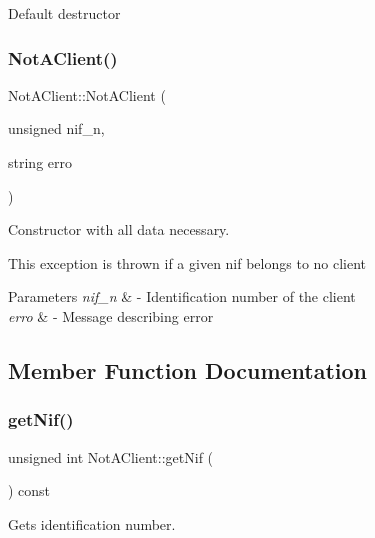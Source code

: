 Default destructor \mbox{\label{class_not_a_client_ababe63b9416f4dd90045d6086292724d}} 
\subsubsection{\texorpdfstring{Not\+A\+Client()}{NotAClient()}}
{\footnotesize\ttfamily Not\+A\+Client\+::\+Not\+A\+Client (\begin{DoxyParamCaption}\item[{unsigned}]{nif\+\_\+n,  }\item[{string}]{erro }\end{DoxyParamCaption})\hspace{0.3cm}{\ttfamily [inline]}}



Constructor with all data necessary. 

This exception is thrown if a given nif belongs to no client


\begin{DoxyParams}{Parameters}
{\em nif\+\_\+n} & -\/ Identification number of the client \\
\hline
{\em erro} & -\/ Message describing error \\
\hline
\end{DoxyParams}


\subsection{Member Function Documentation}
\mbox{\label{class_not_a_client_a70136e2a67ce191dd0091bb8ace19dd9}} 
\subsubsection{\texorpdfstring{get\+Nif()}{getNif()}}
{\footnotesize\ttfamily unsigned int Not\+A\+Client\+::get\+Nif (\begin{DoxyParamCaption}{ }\end{DoxyParamCaption}) const\hspace{0.3cm}{\ttfamily [inline]}}



Gets identification number. 

